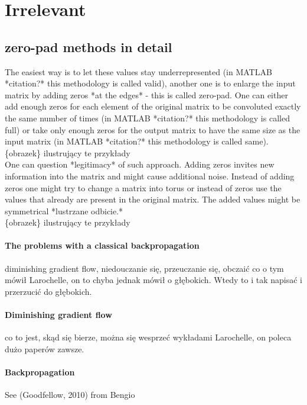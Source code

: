 \documentclass[a4paper,10pt]{report}
\begin{document}
    
  \chapter{Irrelevant} %
    \section{zero-pad methods in detail}
      The easiest way is to let these values stay underrepresented (in MATLAB *citation?* this methodology is called valid), another one is to enlarge the input matrix by adding zeros *at the edges* - this is called zero-pad. One can either add enough zeros for each element of the original matrix to be convoluted exactly the same number of times (in MATLAB *citation?* this methodology is called full) or take only enough zeros for the output matrix to have the same size as the input matrix (in MATLAB *citation?* this methodology is called same).\\
	  
      \{obrazek\} ilustrujący te przykłady \\
	  
      One can question *legitimacy* of such approach. Adding zeros invites new information into the matrix and might cause additional noise. Instead of adding zeros one might try to change a matrix into torus or instead of zeros use the values that already are present in the original matrix. The added values might be symmetrical *lustrzane odbicie.*\\
	  
      \{obrazek\} ilustrujący te przykłady 
      
  
	\subsubsection{The problems with a classical backpropagation} %
	  diminishing gradient flow, niedouczanie się, przeuczanie się, obczaić co o tym mówił Larochelle, on to chyba jednak mówił o głębokich. Wtedy to i tak napisać i przerzucić do głębokich.\\
	
	\subsubsection{Diminishing gradient flow} %
	  co to jest, skąd się bierze, można się wesprzeć wykładami Larochelle, on poleca dużo paperów zawsze.\\
	  
	\subsubsection{Backpropagation} %
	  See (Goodfellow, 2010) from Bengio\\
	
	

    
\end{document}
